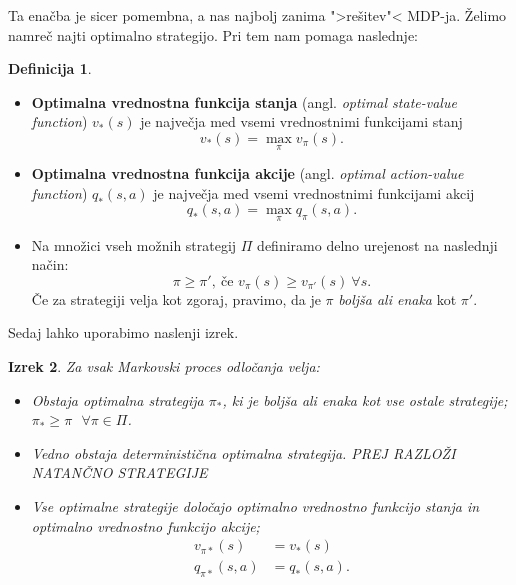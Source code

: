 \documentclass[12pt,a4paper]{amsart}
\theoremstyle{definition} %
\newtheorem{definicija}{Definicija}[section]
\theoremstyle{plain} %
\newtheorem{izrek}[definicija]{Izrek}
\begin{document}
Ta enačba je sicer pomembna, a nas najbolj zanima ">rešitev"< MDP-ja. Želimo namreč najti optimalno 
strategijo. Pri tem nam pomaga naslednje: 

\begin{definicija}
    ~
    \begin{itemize}
        \item \textbf{Optimalna vrednostna funkcija stanja} (angl. \textit{optimal state-value 
                function}) $v_*(s)$ je največja med vsemi vrednostnimi funkcijami stanj
                $$
                v_*(s) = \max_\pi v_\pi(s).
                $$
        \item \textbf{Optimalna vrednostna funkcija akcije} (angl. \textit{optimal action-value 
                function}) $q_*(s, a)$ je največja med vsemi vrednostnimi funkcijami akcij
                $$
                q_*(s, a) = \max_\pi q_\pi(s, a).
                $$
        \item Na množici vseh možnih strategij $\Pi$ definiramo delno urejenost na naslednji način:
                $$
                \pi \geq \pi', \medspace \text{če } v_\pi(s) \geq v_{\pi'}(s) ~ \forall s. 
                $$
                Če za strategiji velja kot zgoraj, pravimo, da je $\pi$ \textit{boljša ali enaka} 
                kot $\pi'$.
    \end{itemize}
\end{definicija}
Sedaj lahko uporabimo naslenji izrek.

\begin{izrek}\label{optim}
    Za vsak Markovski proces odločanja velja: 
    \begin{itemize}
        \item Obstaja \textit{optimalna} strategija $\pi_*$, ki je boljša ali enaka kot vse ostale 
                strategije; $\pi_* \geq \pi \text{ } \forall \pi \in \Pi$. 
        
        \item Vedno obstaja \textit{deterministična} optimalna strategija. PREJ RAZLOŽI NATANČNO 
                STRATEGIJE
        \item Vse optimalne strategije določajo optimalno vrednostno funkcijo stanja in optimalno 
                vrednostno funkcijo akcije; 
                \begin{align*}
                    v_{\pi*}(s) &= v_*(s) \\
                    q_{\pi*}(s, a) &= q_*(s, a).
                \end{align*}
    \end{itemize} 
\end{izrek}
\end{document}
